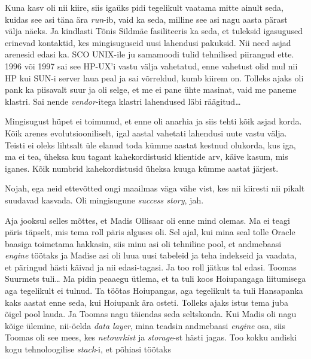 Kuna  kasv oli nii kiire, siis igaüks pidi tegelikult vaatama  mitte ainult 
seda, kuidas see asi täna ära \emph{run}-ib, vaid ka seda, milline see asi nagu 
aasta pärast välja näeks. Ja kindlasti Tõnis Sildmäe 
fasiliteeris ka seda, et tuleksid igasugused erinevad kontaktid, kes 
mingisuguseid uusi lahendusi pakuksid. Nii need 
asjad arenesid edasi ka. SCO UNIX-ile ju samamoodi  tulid tehnilised piirangud 
ette. 1996 või 1997 sai see HP-UX'i vastu välja vahetatud, enne 
vahetust olid mul nii HP kui SUN-i server laua peal ja sai võrreldud, kumb  
kiirem on. Tolleks ajaks oli pank ka piisavalt suur ja oli selge, et me  ei 
pane ühte masinat, vaid me paneme klastri. Sai nende \emph{vendor}-itega  
klastri lahendused läbi räägitud\ldots

Mingisugust hüpet ei toimunud, et enne oli anarhia ja siis  tehti kõik asjad 
korda. Kõik arenes evolutsiooniliselt, igal aastal vahetati lahendusi uute 
vastu välja. Teisti ei oleks lihtsalt üle elanud toda kümme aastat kestnud olukorda, 
kus iga, ma ei tea, üheksa kuu tagant  kahekordistusid klientide arv, käive 
kasum, mis iganes. Kõik numbrid kahekordistusid üheksa kuuga kümme aastat 
järjest.


Nojah, ega neid ettevõtted ongi maailmas väga vähe vist, kes nii kiiresti nii 
pikalt suudavad kasvada. Oli mingisugune \emph{success story}, jah.


Aja jooksul selles mõttes, et Madis Ollisaar oli 
enne mind olemas. Ma ei teagi päris täpselt, mis tema roll päris alguses oli. 
Sel ajal, kui mina seal tolle Oracle baasiga toimetama hakkasin, siis minu 
asi oli tehniline pool, et andmebaasi \emph{engine} töötaks ja Madise 
asi oli luua uusi tabeleid ja teha indekseid ja vaadata, et päringud hästi 
käivad ja nii edasi-tagasi. Ja too roll jätkus tal edasi. Toomas 
Suurmets tuli\ldots
Ma pidin peaaegu ütlema, et ta tuli koos Hoiupangaga liitumisega aga tegelikult 
ei tulnud. Ta töötas Hoiupangas, aga 
tegelikult ta tuli Hansapanka kaks aastat enne seda, kui Hoiupank ära osteti. 
Tolleks ajaks istus 
tema juba õigel pool lauda. Ja Toomas  nagu täiendas seda seltskonda. Kui 
Madis oli nagu kõige ülemine, nii-öelda \emph{data layer}, mina teadsin 
andmebaasi \emph{engine} osa, siis Toomas oli see mees, kes \emph{netowrkist} 
ja \emph{storage}-st hästi jagas.  Too kokku andiski kogu tehnoloogilise 
\emph{stack}-i, et põhiasi töötaks

